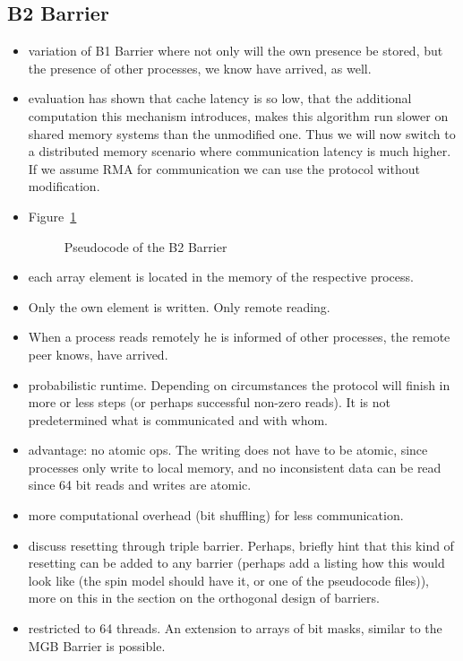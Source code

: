 \documentclass[a4paper, 10pt]{article}
\begin{document}
\subsection{B2 Barrier}
\label{ssec:new-b2}
\begin{itemize}
	\item variation of B1 Barrier where not only will the own presence be stored, but the presence of other processes, we know have arrived, as well.
	\item evaluation has shown that cache latency is so low, that the additional computation this mechanism introduces, makes this algorithm run slower on shared memory systems than the unmodified one. Thus we will now switch to a distributed memory scenario where communication latency is much higher. If we assume RMA for communication we can use the protocol without modification.
	\item Figure~\ref{fig:pseudocode-b2}
		\begin{figure}[htbp]
			\centering
			
			\caption{Pseudocode of the B2 Barrier}
			\label{fig:pseudocode-b2}
		\end{figure}
	\item each array element is located in the memory of the respective process.
	\item Only the own element is written. Only remote reading.
	\item When a process reads remotely he is informed of other processes, the remote peer knows, have arrived.
	\item probabilistic runtime. Depending on circumstances the protocol will finish in more or less steps (or perhaps successful non-zero reads). It is not predetermined what is communicated and with whom.
	\item advantage: no atomic ops. The writing does not have to be atomic, since processes only write to local memory, and no inconsistent data can be read since 64 bit reads and writes are atomic.
	\item more computational overhead (bit shuffling) for less communication.
	\item discuss resetting through triple barrier. Perhaps, briefly hint that this kind of resetting can be added to any barrier (perhaps add a listing how this would look like (the spin model should have it, or one of the pseudocode files)), more on this in the section on the orthogonal design of barriers.
	\item restricted to 64 threads. An extension to arrays of bit masks, similar to the MGB Barrier is possible.
\end{itemize}
\end{document}

